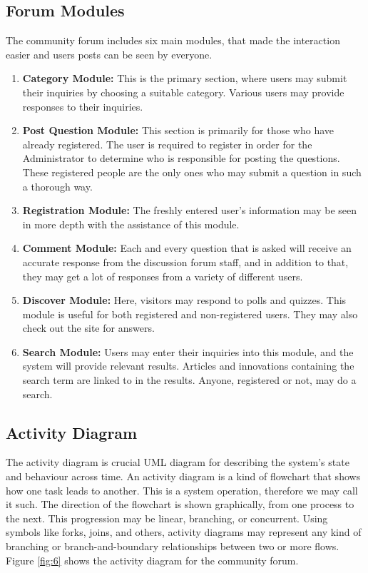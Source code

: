 \subsection{Forum Modules}
The community forum includes six main modules, that made the interaction easier and users posts can be seen by everyone.
\begin{enumerate}[label=$\bullet$]
	\item \textbf{Category Module:} This is the primary section, where users may submit their inquiries by choosing a suitable category. Various users may provide responses to their inquiries.
	\item \textbf{Post Question Module:} This section is primarily for those who have already registered. The user is required to register in order for the Administrator to determine who is responsible for posting the questions. These registered people are the only ones who may submit a question in such a thorough way.
	\item \textbf{Registration Module:} The freshly entered user's information may be seen in more depth with the assistance of this module.
	\item \textbf{Comment Module:} Each and every question that is asked will receive an accurate response from the discussion forum staff, and in addition to that, they may get a lot of responses from a variety of different users.
	\item \textbf{Discover Module:} Here, visitors may respond to polls and quizzes. This module is useful for both registered and non-registered users. They may also check out the site for answers.
	\item \textbf{Search Module:} Users may enter their inquiries into this module, and the system will provide relevant results. Articles and innovations containing the search term are linked to in the results. Anyone, registered or not, may do a search.
\end{enumerate}

\subsection{Activity Diagram}
The activity diagram is crucial UML diagram for describing the system's state and behaviour across time. An activity diagram is a kind of flowchart that shows how one task leads to another. This is a system operation, therefore we may call it such. The direction of the flowchart is shown graphically, from one process to the next. This progression may be linear, branching, or concurrent. Using symbols like forks, joins, and others, activity diagrams may represent any kind of branching or branch-and-boundary relationships between two or more flows. Figure \ref{fig:6} shows the activity diagram for the community forum.

